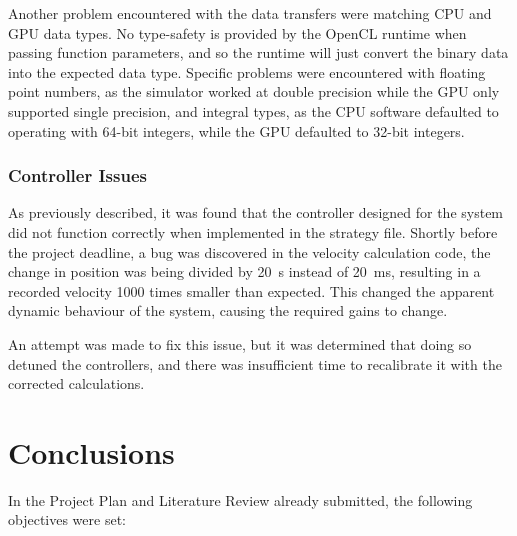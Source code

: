 \documentclass[10pt]{article}
\begin{document}
Another problem encountered with the data transfers were matching CPU and
GPU data types.  No type-safety is provided by the OpenCL runtime when
passing function parameters, and so the runtime will just convert the binary
data into the expected data type.  Specific problems were encountered with
floating point numbers, as the simulator worked at double precision while the
GPU only supported single precision, and integral types, as the CPU
software defaulted to operating with 64-bit integers, while the GPU defaulted to
32-bit integers.

\subsubsection{Controller Issues}

As previously described, it was found that the controller designed for the
system did not function correctly when implemented in the strategy file. 
Shortly before the project deadline, a bug was discovered in the velocity
calculation code, the change in position was being divided by \SI{20}{\second}
instead of \SI{20}{\milli\second}, resulting in a recorded velocity 1000 times
smaller than expected.  This changed the apparent dynamic behaviour of the
system, causing the required gains to change.

An attempt was made to fix this issue, but it was determined that doing so
detuned the controllers, and there was insufficient time to recalibrate it with
the corrected calculations.

\section{Conclusions}

In the Project Plan and Literature Review already submitted, the following
objectives were set:
\end{document}
